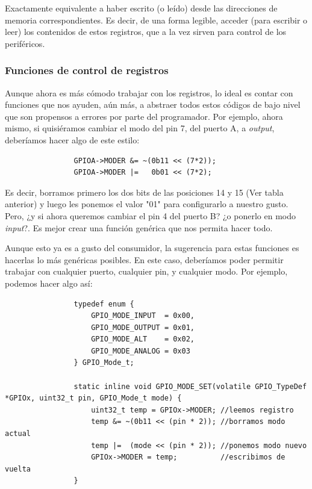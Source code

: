 \documentclass[../main.tex]{subfiles}
\begin{document}
            Exactamente equivalente a haber escrito (o leído) desde las direcciones de memoria correspondientes. Es decir, de una forma legible, acceder (para escribir o leer) los contenidos de estos registros, que a la vez sirven para control de los periféricos. 


            
        \subsubsection{Funciones de control de registros}
            Aunque ahora es más cómodo trabajar con los registros, lo ideal es contar con funciones que nos ayuden, aún más, a abstraer todos estos códigos de bajo nivel que son propensos a errores por parte del programador. Por ejemplo, ahora mismo, si quisiéramos cambiar el modo del pin 7, del puerto A, a \textit{output}, deberíamos hacer algo de este estilo:

            \begin{lstlisting}
                GPIOA->MODER &= ~(0b11 << (7*2));
                GPIOA->MODER |=   0b01 << (7*2);
            \end{lstlisting}

            Es decir, borramos primero los dos bits de las posiciones 14 y 15 (Ver tabla anterior) y luego les ponemos el valor "01" para configurarlo a nuestro gusto. Pero, ¿y si ahora queremos cambiar el pin 4 del puerto B? ¿o ponerlo en modo \textit{input}?. Es mejor crear una función genérica que nos permita hacer todo.

            Aunque esto ya es a gusto del consumidor, la sugerencia para estas funciones es hacerlas lo más genéricas posibles. En este caso, deberíamos poder permitir trabajar con cualquier puerto, cualquier pin, y cualquier modo. Por ejemplo, podemos hacer algo así:

            \begin{lstlisting}
                typedef enum {
                    GPIO_MODE_INPUT  = 0x00,
                    GPIO_MODE_OUTPUT = 0x01,
                    GPIO_MODE_ALT    = 0x02,
                    GPIO_MODE_ANALOG = 0x03
                } GPIO_Mode_t;

                static inline void GPIO_MODE_SET(volatile GPIO_TypeDef *GPIOx, uint32_t pin, GPIO_Mode_t mode) {
                    uint32_t temp = GPIOx->MODER; //leemos registro
                    temp &= ~(0b11 << (pin * 2)); //borramos modo actual
                    temp |=  (mode << (pin * 2)); //ponemos modo nuevo
                    GPIOx->MODER = temp;          //escribimos de vuelta
                }
            \end{lstlisting}
\end{document}
